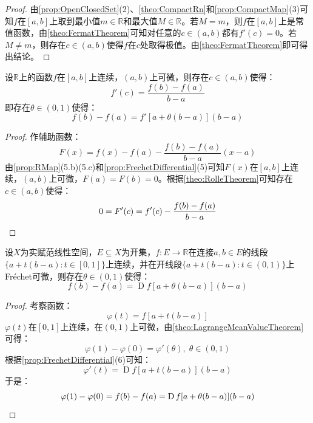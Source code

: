 \begin{proof}
	由\cref{prop:OpenClosedSet}(2)、\cref{theo:CompactRn}和\cref{prop:CompactMap}(3)可知$f$在$[a,b]$上取到最小值$m\in\mathbb{R}$和最大值$M\in\mathbb{R}$。若$M=m$，则$f$在$[a,b]$上是常值函数，由\cref{theo:FermatTheorem}可知对任意的$c\in(a,b)$都有$f'(c)=0$。若$M\ne m$，则存在$c\in(a,b)$使得$f$在$c$处取得极值。由\cref{theo:FermatTheorem}即可得出结论。
\end{proof}
\begin{theorem}\label{theo:LagrangeMeanValueTheorem}
	设$\mathbb{R}$上的函数$f$在$[a,b]$上连续，$(a,b)$上可微，则存在$c\in(a,b)$使得：
	\begin{equation*}
		f'(c)=\frac{f(b)-f(a)}{b-a}
	\end{equation*}
	即存在$\theta\in(0,1)$使得：
	\begin{equation*}
		f(b)-f(a)=f'[a+\theta(b-a)](b-a)
	\end{equation*}
\end{theorem}
\begin{proof}
	作辅助函数：
	\begin{equation*}
		F(x)=f(x)-f(a)-\frac{f(b)-f(a)}{b-a}(x-a)
	\end{equation*}
	由\cref{prop:RMap}(5.b)(5.c)和\cref{prop:FrechetDifferential}(5)可知$F(x)$在$[a,b]$上连续，$(a,b)$上可微，$F(a)=F(b)=0$。根据\cref{theo:RolleTheorem}可知存在$c\in(a,b)$使得：
	\begin{equation*}
		0=F'(c)=f'(c)-\frac{f(b)-f(a)}{b-a}\qedhere
	\end{equation*}
\end{proof}
\begin{theorem}[有限增量公式]\label{theo:FiniteIncrement}
	设$X$为实赋范线性空间，$E\subseteq X$为开集，$f:E\to\mathbb{R}$在连接$a,b\in E$的线段$\{a+t(b-a):t\in[0,1]\}$上连续，并在开线段$\{a+t(b-a):t\in(0,1)\}$上Fr\'echet可微，则存在$\theta\in(0,1)$使得：
	\begin{equation*}
		f(b)-f(a)=\operatorname{D}f[a+\theta(b-a)](b-a)
	\end{equation*}
\end{theorem}
\begin{proof}
	考察函数：
	\begin{equation*}
		\varphi(t)=f[a+t(b-a)]
	\end{equation*}
	$\varphi(t)$在$[0,1]$上连续，在$(0,1)$上可微，由\cref{theo:LagrangeMeanValueTheorem}可得：
	\begin{equation*}
		\varphi(1)-\varphi(0)=\varphi'(\theta),\;\theta\in(0,1)
	\end{equation*}
	根据\cref{prop:FrechetDifferential}(6)可知：
	\begin{equation*}
		\varphi'(t)=\operatorname{D}f[a+t(b-a)](b-a)
	\end{equation*}
	于是：
	\begin{equation*}
		\varphi(1)-\varphi(0)=f(b)-f(a)=\operatorname{D}f[a+\theta(b-a)](b-a)\qedhere
	\end{equation*}
\end{proof}
